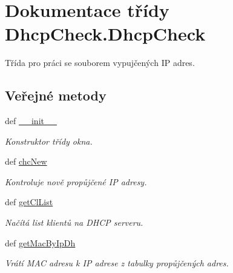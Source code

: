 \hypertarget{classDhcpCheck_1_1DhcpCheck}{\section{Dokumentace třídy Dhcp\-Check.\-Dhcp\-Check}
\label{df/db0/classDhcpCheck_1_1DhcpCheck}
}


Třída pro práci se souborem vypujčených I\-P adres.  


\subsection*{Veřejné metody}
\begin{DoxyCompactItemize}
\item 
def \hyperlink{classDhcpCheck_1_1DhcpCheck_a96437be47fab72ad232f68029e3ced97}{\-\_\-\-\_\-init\-\_\-\-\_\-}
\begin{DoxyCompactList}\small\item\em Konstruktor třídy okna. \end{DoxyCompactList}\item 
def \hyperlink{classDhcpCheck_1_1DhcpCheck_ad1c0e03ff71f3cf29f29667be833c33f}{chc\-New}
\begin{DoxyCompactList}\small\item\em Kontroluje nově propůjčené I\-P adresy. \end{DoxyCompactList}\item 
def \hyperlink{classDhcpCheck_1_1DhcpCheck_a77ee6b7f23e71d4ea91e0d97b398da43}{get\-Cl\-List}
\begin{DoxyCompactList}\small\item\em Načítá list klientů na D\-H\-C\-P serveru. \end{DoxyCompactList}\item 
def \hyperlink{classDhcpCheck_1_1DhcpCheck_ae1bfc1a6d8b07eb5d1166459d4e99330}{get\-Mac\-By\-Ip\-Dh}
\begin{DoxyCompactList}\small\item\em Vrátí M\-A\-C adresu k I\-P adrese z tabulky propůjčených adres. \end{DoxyCompactList}\end{DoxyCompactItemize}
